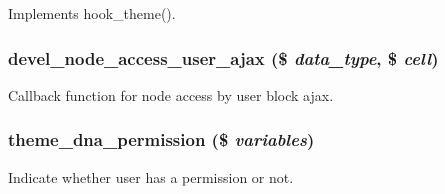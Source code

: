 \label{devel__node__access_8module_a0bc44f963481619ef0dabc255aa3a850}
Implements hook\_\-theme(). \hypertarget{devel__node__access_8module_a961a9a76d97dc0c7e505a39545dcdd72}{
\subsubsection[{devel\_\-node\_\-access\_\-user\_\-ajax}]{\setlength{\rightskip}{0pt plus 5cm}devel\_\-node\_\-access\_\-user\_\-ajax (\$ {\em data\_\-type}, \/  \$ {\em cell})}}
\label{devel__node__access_8module_a961a9a76d97dc0c7e505a39545dcdd72}
Callback function for node access by user block ajax. \hypertarget{devel__node__access_8module_a9a1d86356d3e21f44fd2bc73a915b329}{
\subsubsection[{theme\_\-dna\_\-permission}]{\setlength{\rightskip}{0pt plus 5cm}theme\_\-dna\_\-permission (\$ {\em variables})}}
\label{devel__node__access_8module_a9a1d86356d3e21f44fd2bc73a915b329}
Indicate whether user has a permission or not. 